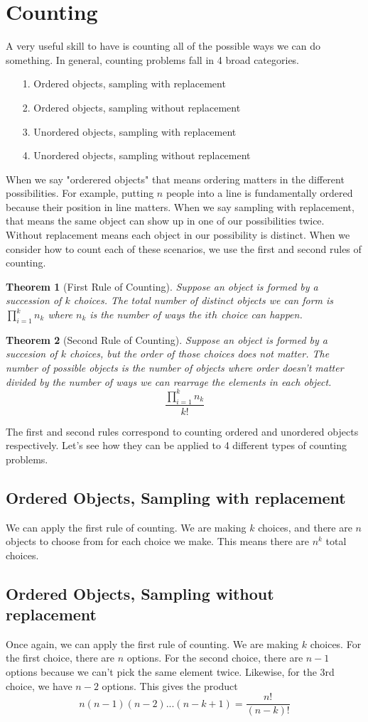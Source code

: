\documentclass{article}
\newtheorem{theorem}{Theorem}
\begin{document}
\section{Counting}
A very useful skill to have is counting all of the possible ways we can do something. In general, counting problems fall in 4 broad categories.
\begin{itemize}
    \item[1.] Ordered objects, sampling with replacement
    \item[2.] Ordered objects, sampling without replacement
    \item[3.] Unordered objects, sampling with replacement
    \item[4.] Unordered objects, sampling without replacement    
\end{itemize}
When we say "orderered objects" that means ordering matters in the different possibilities. For example, putting $n$ people 
into a line is fundamentally ordered because their position in line matters. When we say sampling with replacement, that means
the same object can show up in one of our possibilities twice. Without replacement means each object in our possibility is distinct.
When we consider how to count each of these scenarios, we use the first and second rules of counting.
\begin{theorem}[First Rule of Counting]
    Suppose an object is formed by a succession of $k$ choices. The total number of distinct objects we can form is
    $\prod_{i=1}^{k}{n_k}$ where $n_k$ is the number of ways the $ith$ choice can happen.
\end{theorem}
\begin{theorem}[Second Rule of Counting]
    Suppose an object is formed by a succesion of $k$ choices, but the order of those choices does not matter.
    The number of possible objects is the number of objects where order doesn't matter divided by the number of ways
    we can rearrage the elements in each object.
    $$\frac{\prod_{i=1}^{k}{n_k}}{k!}$$
\end{theorem}
The first and second rules correspond to counting ordered and unordered objects respectively. Let's see how they can be applied to 4 different
types of counting problems.
\subsection{Ordered Objects, Sampling with replacement}
We can apply the first rule of counting. We are making $k$ choices, and there are $n$ objects to choose from
for each choice we make. This means there are $n^k$ total choices.
\subsection{Ordered Objects, Sampling without replacement}
Once again, we can apply the first rule of counting. We are making $k$ choices. For the first choice, there are $n$ options.
For the second choice, there are $n-1$ options because we can't pick the same element twice. Likewise, for the 3rd choice, we have $n-2$ options.
This gives the product
$$n(n-1)(n-2)...(n-k+1) = \frac{n!}{(n-k)!}$$
\end{document}
